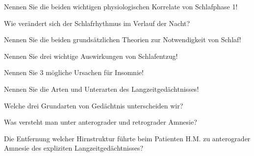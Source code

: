 \documentclass[10pt, a4paper]{exam}
\begin{document}
\begin{questions}
\begin{solution}
  \end{solution}

  \question Nennen Sie die beiden wichtigen physiologischen Korrelate von Schlafphase 1!
  \begin{solution}

  \end{solution}

  \question Wie verändert sich der Schlafrhythmus im Verlauf der Nacht?
  \begin{solution}

  \end{solution}

  \question Nennen Sie die beiden grundsätzlichen Theorien zur Notwendigkeit von Schlaf!
  \begin{solution}

  \end{solution}

  \question Nennen Sie drei wichtige Auswirkungen von Schlafentzug!
  \begin{solution}

  \end{solution}

  \question Nennen Sie 3 mögliche Ursachen für Insomnie!
  \begin{solution}

  \end{solution}

  \question Nennen Sie die Arten und Unterarten des Langzeitgedächtnisses!
  \begin{solution}

  \end{solution}

  \question Welche drei Grundarten von Gedächtnis unterscheiden wir?
  \begin{solution}

  \end{solution}

  \question Was versteht man unter anterograder und retrograder Amnesie?
  \begin{solution}

  \end{solution}

  \question Die Entfernung welcher Hirnstruktur führte beim Patienten H.M. zu anterograder Amnesie des expliziten Langzeitgedächtnisses?
  \begin{solution}

  \end{solution}


\end{questions}
\end{document}
